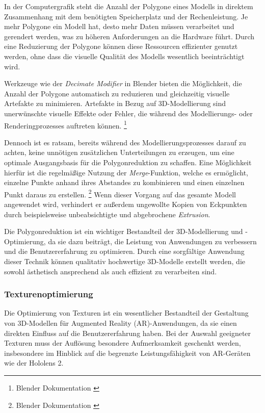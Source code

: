 In der Computergrafik steht die Anzahl der Polygone eines Modells in direktem Zusammenhang mit dem benötigten Speicherplatz und der Rechenleistung. Je mehr Polygone ein Modell hat, desto mehr Daten müssen verarbeitet und gerendert werden, was zu höheren Anforderungen an die Hardware führt. Durch eine Reduzierung der Polygone können diese Ressourcen effizienter genutzt werden, ohne dass die visuelle Qualität des Modells wesentlich beeinträchtigt wird.

Werkzeuge wie der \textit{Decimate Modifier} in Blender bieten die Möglichkeit, die Anzahl der Polygone automatisch zu reduzieren und gleichzeitig visuelle Artefakte zu minimieren. Artefakte in Bezug auf 3D-Modellierung sind unerwünschte visuelle Effekte oder Fehler, die während des Modellierungs- oder Renderingprozesses auftreten können. \footnote{Blender Dokumentation \cite {Decimate Modifier}}

Dennoch ist es ratsam, bereits während des Modellierungsprozesses darauf zu achten, keine unnötigen zusätzlichen Unterteilungen zu erzeugen, um eine optimale Ausgangsbasis für die Polygonreduktion zu schaffen. Eine Möglichkeit hierfür ist die regelmäßige Nutzung der \textit{Merge}-Funktion, welche es ermöglicht, einzelne Punkte anhand ihres Abstandes zu kombinieren und einen einzelnen Punkt daraus zu erstellen. \footnote{Blender Dokumentation \cite {Merge Funktion}} Wenn dieser Vorgang auf das gesamte Modell angewendet wird, verhindert er außerdem ungewollte Kopien von Eckpunkten durch beispielsweise unbeabsichtigte und abgebrochene \textit{Extrusion}.

Die Polygonreduktion ist ein wichtiger Bestandteil der 3D-Modellierung und -Optimierung, da sie dazu beiträgt, die Leistung von Anwendungen zu verbessern und die Benutzererfahrung zu optimieren. Durch eine sorgfältige Anwendung dieser Technik können qualitativ hochwertige 3D-Modelle erstellt werden, die sowohl ästhetisch ansprechend als auch effizient zu verarbeiten sind.

\subsubsection{Texturenoptimierung}
Die Optimierung von Texturen ist ein wesentlicher Bestandteil der Gestaltung von 3D-Modellen für Augmented Reality (AR)-Anwendungen, da sie einen direkten Einfluss auf die Benutzererfahrung haben. Bei der Auswahl geeigneter Texturen muss der Auflösung besondere Aufmerksamkeit geschenkt werden, insbesondere im Hinblick auf die begrenzte Leistungsfähigkeit von AR-Geräten wie der Hololens 2.

